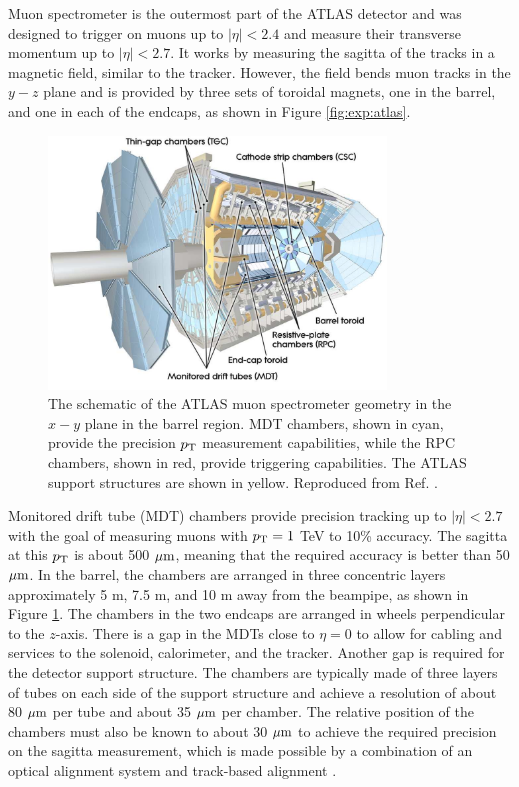 Muon spectrometer is the outermost part of the ATLAS detector and was designed to
trigger on muons up to $|\eta| < 2.4$ and measure their transverse momentum up
to $|\eta| < 2.7$. It works by measuring the sagitta of the tracks
in a magnetic field, similar to the tracker. However, the field
bends muon tracks in the $y-z$ plane and is provided by three sets of
toroidal magnets, one in the barrel, and one in each of the endcaps,
as shown in Figure \ref{fig:exp:atlas}. 
\begin{figure}[h!]
  \centering
  \includegraphics[width=0.8\textwidth]{figures/experiment/muonspectrometer}
  \caption[The ATLAS muon spectrometer]{The schematic of the ATLAS muon
  spectrometer geometry in the $x-y$ plane in the barrel region. MDT
  chambers, shown in cyan, provide the precision $p_{\text{T}}$ measurement
  capabilities, while the RPC chambers, shown in red, provide triggering
  capabilities. The ATLAS support structures are shown in yellow.
  Reproduced from Ref. \cite{Aad:2010ag}.}
   \label{fig:exp:ms}
\end{figure}

Monitored drift tube (MDT) chambers provide precision tracking up to
$|\eta| < 2.7$ with the goal of measuring muons with $p_{\text{T}} = 1$ TeV
to 10\% accuracy. The sagitta at this $p_{\text{T}}$ is about 500 $\mu\text{m}$,
meaning that the required accuracy is better than 50 $\mu\text{m}$.
In the barrel, the chambers are arranged in three concentric
layers approximately 5 m, 7.5 m, and 10 m away from the beampipe, as
shown in Figure \ref{fig:exp:ms}. The chambers in the two endcaps are
arranged in wheels perpendicular to the $z$-axis. There is a gap in
the MDTs close to $\eta = 0$ to allow for cabling and services to
the solenoid, calorimeter, and the tracker. Another gap is required
for the detector support structure. The chambers are typically
made of three layers of tubes on each side of the support structure
and achieve a resolution of about 80 $\mu\text{m}$ per tube and about
35 $\mu\text{m}$ per chamber. The relative position of the chambers must also be
known to about 30 $\mu\text{m}$ to achieve the required precision on the sagitta
measurement, which is made possible by a combination of an optical alignment
system and track-based alignment \cite{Aad:2010ag, Aefsky:1380912, Aad:2008zzm}.

